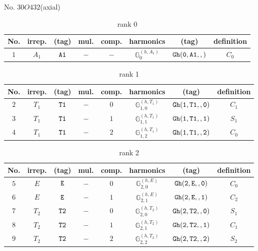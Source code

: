 \documentclass[fleqn,8pt]{jsarticle}
\begin{document}
\setcounter{MaxMatrixCols}{16}

\begin{center}
\LARGE
No. 30\quad$O$\quad$432$\quad[ cubic ] (axial)
\end{center}
\begin{table}[ht!]
\begin{center}
\caption{rank 0}
\renewcommand{\arraystretch}{1.3}
\begin{tabular}{cccccccc} \hline \hline
No. & irrep. & (tag) & mul. & comp. & harmonics & (tag) & definition \\ \hline
$ 1 $ & $ A_{1} $ & $ {\tt A1} $ & $ - $ & $ - $ & $ \mathbb{G}_{0}^{(h,A_{1})} $ & $ {\tt Gh(0,A1,,)} $ & $ C_{0} $ \\
 \hline \hline
\end{tabular}
\end{center}
\end{table}
\begin{table}[ht!]
\begin{center}
\caption{rank 1}
\renewcommand{\arraystretch}{1.3}
\begin{tabular}{cccccccc} \hline \hline
No. & irrep. & (tag) & mul. & comp. & harmonics & (tag) & definition \\ \hline
$ 2 $ & $ T_{1} $ & $ {\tt T1} $ & $ - $ & $ 0 $ & $ \mathbb{G}_{1,0}^{(h,T_{1})} $ & $ {\tt Gh(1,T1,,0)} $ & $ C_{1} $ \\
$ 3 $ & $ T_{1} $ & $ {\tt T1} $ & $ - $ & $ 1 $ & $ \mathbb{G}_{1,1}^{(h,T_{1})} $ & $ {\tt Gh(1,T1,,1)} $ & $ S_{1} $ \\
$ 4 $ & $ T_{1} $ & $ {\tt T1} $ & $ - $ & $ 2 $ & $ \mathbb{G}_{1,2}^{(h,T_{1})} $ & $ {\tt Gh(1,T1,,2)} $ & $ C_{0} $ \\
 \hline \hline
\end{tabular}
\end{center}
\end{table}
\begin{table}[ht!]
\begin{center}
\caption{rank 2}
\renewcommand{\arraystretch}{1.3}
\begin{tabular}{cccccccc} \hline \hline
No. & irrep. & (tag) & mul. & comp. & harmonics & (tag) & definition \\ \hline
$ 5 $ & $ E $ & $ {\tt E} $ & $ - $ & $ 0 $ & $ \mathbb{G}_{2,0}^{(h,E)} $ & $ {\tt Gh(2,E,,0)} $ & $ C_{0} $ \\
$ 6 $ & $ E $ & $ {\tt E} $ & $ - $ & $ 1 $ & $ \mathbb{G}_{2,1}^{(h,E)} $ & $ {\tt Gh(2,E,,1)} $ & $ C_{2} $ \\
$ 7 $ & $ T_{2} $ & $ {\tt T2} $ & $ - $ & $ 0 $ & $ \mathbb{G}_{2,0}^{(h,T_{2})} $ & $ {\tt Gh(2,T2,,0)} $ & $ S_{1} $ \\
$ 8 $ & $ T_{2} $ & $ {\tt T2} $ & $ - $ & $ 1 $ & $ \mathbb{G}_{2,1}^{(h,T_{2})} $ & $ {\tt Gh(2,T2,,1)} $ & $ C_{1} $ \\
$ 9 $ & $ T_{2} $ & $ {\tt T2} $ & $ - $ & $ 2 $ & $ \mathbb{G}_{2,2}^{(h,T_{2})} $ & $ {\tt Gh(2,T2,,2)} $ & $ S_{2} $ \\
 \hline \hline
\end{tabular}
\end{center}
\end{table}
\end{document}
